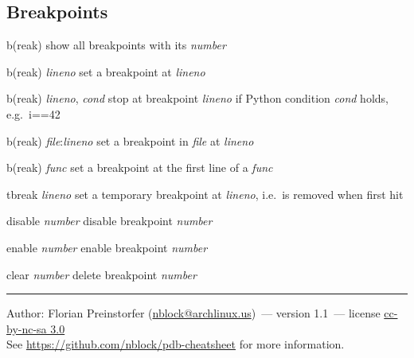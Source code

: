 \documentclass[10pt,landscape,a4paper]{article}
\makeatletter
\newcommand{\theauthor}{Florian Preinstorfer (\href{mailto:nblock@archlinux.us}{nblock@archlinux.us})}
\newcommand{\theversion}{1.1}
\makeatother
\begin{document}
\begin{multicols}{2}
    \subsection{Breakpoints}
      \begin{eqlist}
        \item[b(reak)] show all breakpoints with its \textit{number}
        \item[b(reak) \textit{lineno}] set a breakpoint at \textit{lineno}
        \item[b(reak) \textit{lineno}, \textit{cond}] stop at breakpoint \textit{lineno} if Python condition \textit{cond} holds, e.g.\ i==42
        \item[b(reak) \textit{file}:\textit{lineno}] set a breakpoint in \textit{file} at \textit{lineno}
        \item[b(reak) \textit{func}] set a breakpoint at the first line of a \textit{func}
        \item[tbreak \textit{lineno}] set a temporary breakpoint at \textit{lineno}, i.e.\ is removed when first hit
        \item[disable \textit{number}] disable breakpoint \textit{number}
        \item[enable \textit{number}] enable breakpoint \textit{number}
        \item[clear \textit{number}] delete breakpoint \textit{number}
      \end{eqlist}

    \small{%
    \hrule
    Author: \theauthor~--- version \theversion~--- license \href{https://creativecommons.org/licenses/by-nc-sa/3.0}{cc-by-nc-sa 3.0}\\
    See \url{https://github.com/nblock/pdb-cheatsheet} for more information.
    }
  \end{multicols}
\end{document}

